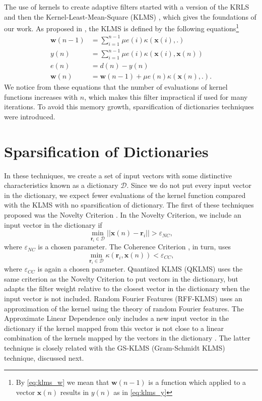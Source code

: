 The use of kernels to create adaptive filters started with a version of the KRLS \cite{engel_kernel_2004} and then the Kernel-Least-Mean-Square (KLMS) \cite{liu_kernel_2008}, 
which gives the foundations of our work. As proposed in \cite{liu_kernel_2008}, the KLMS is defined by the following equations\footnote{By \eqref{eq:klms_w} we mean that $\mathbf{w}(n-1)$ is a function which applied to a vector $\mathbf{x}(n)$ results in $y(n)$ as in \eqref{eq:klms_y}}
\begin{align}
    \mathbf{w}(n-1) &= \sum_{i=1}^{n-1}\mu e(i)\kappa(\mathbf{x}(i),.)\label{eq:klms_w}\\
    y(n) &= \sum_{i=1}^{n-1}\mu e(i)\kappa(\mathbf{x}(i),\mathbf{x}(n))\label{eq:klms_y}\\
    e(n) &= d(n) - y(n)\\
    \mathbf{w}(n) &= \mathbf{w}(n-1) +\mu e(n)\kappa(\mathbf{x}(n),.).
\end{align}
We notice from these equations that the number of evaluations of kernel functions increases with $n$, which makes this filter impractical if used for many iterations. 
To avoid this memory growth, sparsification of dictionaries techniques were introduced.

\section{Sparsification of Dictionaries}

In these techniques, we create a set of input vectors with some distinctive characteristics known as a dictionary $\mathcal{D}$. Since we do not put every input vector 
in the dictionary, we expect fewer evaluations of the kernel function compared with the KLMS with no sparsification of dictionary. The first of these techniques proposed 
was the Novelty Criterion \cite{platt_resource-allocating_1991}. In the Novelty Criterion, we include an input vector in the dictionary if
\begin{equation}
    \min_{\mathbf{r}_i \in \mathcal{D}} ||\mathbf{x}(n) - \mathbf{r}_i||>\varepsilon_{NC},
\end{equation}
where $\varepsilon_{NC}$ is a chosen parameter. The Coherence Criterion \cite{richard_online_2009}, in turn, uses
\begin{equation}
    \min_{\mathbf{r}_i \in \mathcal{D}} \kappa(\mathbf{r}_i,\mathbf{x}(n)) < \varepsilon_{CC},
\end{equation}
where $\varepsilon_{CC}$ is again a chosen parameter. Quantized KLMS (QKLMS) \cite{badong_chen_quantized_2012} uses the same criterion as the Novelty Criterion to put 
vectors in the dictionary, but adapts the filter weight relative to the closest vector in the dictionary when the input vector is not included. Random Fourier Features (RFF-KLMS) \cite{bouboulis_efficient_2016} uses an 
approximation of the kernel using the theory of random Fourier features. The Approximate Linear Dependence only includes a new input vector in the dictionary if the kernel 
mapped from this vector is not close to a linear combination of the kernels mapped by the vectors in the dictionary \cite{engel_kernel_2004}. The latter technique is closely related with the GS-KLMS (Gram-Schmidt KLMS) technique, discussed next.

